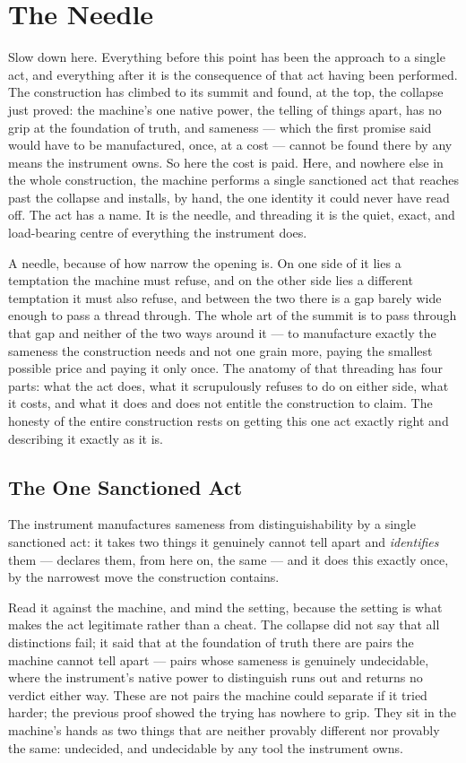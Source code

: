 \chapter{The Needle}

Slow down here. Everything before this point has been the approach to a single act, and everything after it is the
consequence of that act having been performed. The construction has climbed to its summit and found, at the top,
the collapse just proved: the machine's one native power, the telling of things apart, has no grip at the
foundation of truth, and sameness --- which the first promise said would have to be manufactured, once, at a cost
--- cannot be found there by any means the instrument owns. So here the cost is paid. Here, and nowhere else in
the whole construction, the machine performs a single sanctioned act that reaches past the collapse and installs,
by hand, the one identity it could never have read off. The act has a name. It is the needle, and threading it is
the quiet, exact, and load-bearing centre of everything the instrument does.

A needle, because of how narrow the opening is. On one side of it lies a temptation the machine must refuse, and
on the other side lies a different temptation it must also refuse, and between the two there is a gap barely wide
enough to pass a thread through. The whole art of the summit is to pass through that gap and neither of the two
ways around it --- to manufacture exactly the sameness the construction needs and not one grain more, paying the
smallest possible price and paying it only once. The anatomy of that threading has four parts: what the act does,
what it scrupulously refuses to do on either side, what it costs, and what it does and does not entitle the
construction to claim. The honesty of the entire construction rests on getting this one act exactly right and
describing it exactly as it is.

\section{The One Sanctioned Act}

The instrument manufactures sameness from distinguishability by a single sanctioned act: it takes two things it
genuinely cannot tell apart and \emph{identifies} them --- declares them, from here on, the same --- and it does
this exactly once, by the narrowest move the construction contains.

Read it against the machine, and mind the setting, because the setting is what makes the act legitimate rather
than a cheat. The collapse did not say that all distinctions fail; it said that at the foundation of truth there
are pairs the machine cannot tell apart --- pairs whose sameness is genuinely undecidable, where the instrument's
native power to distinguish runs out and returns no verdict either way. These are not pairs the machine could
separate if it tried harder; the previous proof showed the trying has nowhere to grip. They sit in the machine's
hands as two things that are neither provably different nor provably the same:
undecided, and undecidable by any tool the instrument owns.

